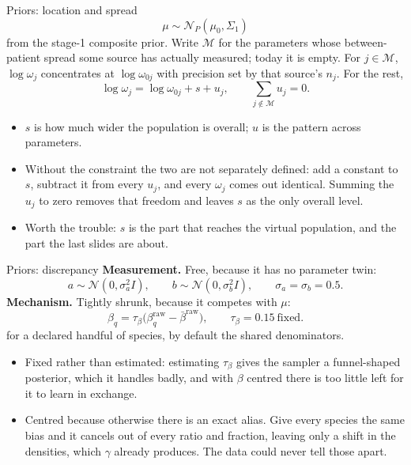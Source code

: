 \documentclass[10pt,aspectratio=169]{beamer}
\newcommand{\Ncal}{\mathcal{N}}
\newcommand{\Mset}{\mathcal{M}}
\begin{document}
\begin{frame}[t]{Priors: location and spread}
  \[ \mu \sim \Ncal_P(\mu_0,\Sigma_1) \]
  from the stage-1 composite prior. Write $\Mset$ for the parameters whose
  between-patient spread some source has actually measured; today it is empty.
  For $j\in\Mset$, $\log\omega_j$ concentrates at $\log\omega_{0j}$ with
  precision set by that source's $n_j$. For the rest,
  \[
    \log\omega_j = \log\omega_{0j} + s + u_j,
    \qquad \textstyle\sum_{j\notin\Mset} u_j = 0 .
  \]
  \begin{itemize}\small
    \item $s$ is how much wider the population is overall; $u$ is the pattern
      across parameters.
    \item Without the constraint the two are not separately defined: add a
      constant to $s$, subtract it from every $u_j$, and every $\omega_j$ comes
      out identical. Summing the $u_j$ to zero removes that freedom and leaves
      $s$ as the only overall level.
    \item Worth the trouble: $s$ is the part that reaches the virtual population,
      and the part the last slides are about.
  \end{itemize}
\end{frame}

\begin{frame}[t]{Priors: discrepancy}
  \textbf{Measurement.} Free, because it has no parameter twin:
  \[ a\sim\Ncal(0,\sigma_a^2 I), \qquad b\sim\Ncal(0,\sigma_b^2 I),
     \qquad \sigma_a=\sigma_b=0.5 . \]
  \textbf{Mechanism.} Tightly shrunk, because it competes with $\mu$:
  \[
    \beta_q = \tau_\beta\big(\beta^{\text{raw}}_q - \bar\beta^{\text{raw}}\big),
    \qquad \tau_\beta = 0.15 \ \text{fixed}.
  \]
  for a declared handful of species, by default the shared denominators.
  \begin{itemize}\small
    \item Fixed rather than estimated: estimating $\tau_\beta$ gives the sampler
      a funnel-shaped posterior, which it handles badly, and with $\beta$ centred
      there is too little left for it to learn in exchange.
    \item Centred because otherwise there is an exact alias. Give every species
      the same bias and it cancels out of every ratio and fraction, leaving only
      a shift in the densities, which $\gamma$ already produces. The data could
      never tell those apart.
  \end{itemize}
\end{frame}
\end{document}
